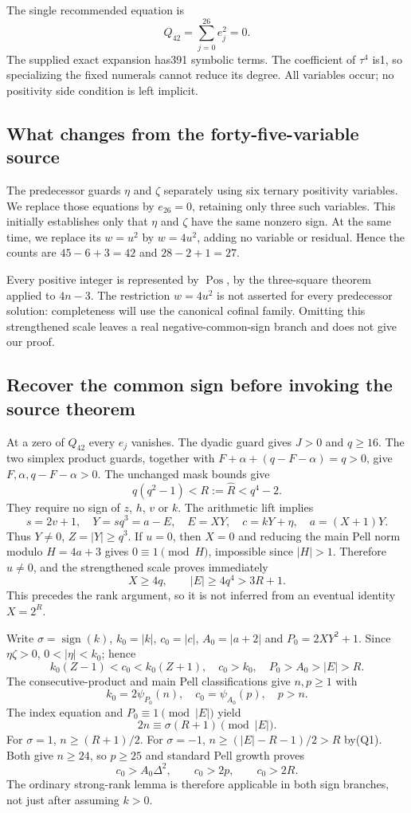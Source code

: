 The single recommended equation is
\[
 \boxed{\quad Q_{42}=\sum_{j=0}^{26}e_j^2=0.\quad}
\]
The supplied exact expansion has391 symbolic terms. The coefficient of
$\tau^4$ is1, so specializing the fixed numerals cannot reduce its degree.
All variables occur; no positivity side condition is left implicit.

\subsection{What changes from the forty-five-variable source}
The predecessor guards $\eta$ and $\zeta$ separately using six ternary
positivity variables. We replace those equations by $e_{26}=0$, retaining
only three such variables. This initially establishes only that $\eta$ and
$\zeta$ have the same nonzero sign. At the same time, we replace its
$w=u^2$ by $w=4u^2$, adding no variable or residual. Hence the counts are
$45-6+3=42$ and $28-2+1=27$.

Every positive integer is represented by $\operatorname{Pos}$, by the
three-square theorem applied to $4n-3$. The restriction $w=4u^2$ is not
asserted for every predecessor solution: completeness will use the
canonical cofinal family. Omitting this strengthened scale leaves a real
negative-common-sign branch and does not give our proof.

\subsection{Recover the common sign before invoking the source theorem}
At a zero of $Q_{42}$ every $e_j$ vanishes. The dyadic guard gives $J>0$ and
$q\ge16$. The two simplex product guards, together with
$F+\alpha+(q-F-\alpha)=q>0$, give $F,\alpha,q-F-\alpha>0$.
The unchanged mask bounds give
\[
 q(q^2-1)<R:=\widehat R<q^4-2.
\]
They require no sign of $z$, $h$, $v$ or $k$.
The arithmetic lift implies
\[
 s=2v+1,\quad Y=sq^3=a-E,\quad E=XY,\quad
 c=kY+\eta,\quad a=(X+1)Y.
\]
Thus $Y\ne0$, $Z=|Y|\ge q^3$. If $u=0$, then $X=0$ and reducing the
main Pell norm modulo $H=4a+3$ gives $0\equiv1\pmod H$, impossible since
$|H|>1$. Therefore $u\ne0$, and the strengthened scale proves immediately
\[
 X\ge4q,\qquad |E|\ge4q^4>3R+1.                 \tag{Q1}
\]
This precedes the rank argument, so it is not inferred from an eventual
identity $X=2^R$.

Write $\sigma=\operatorname{sign}(k)$, $k_0=|k|$, $c_0=|c|$,
$A_0=|a+2|$ and $P_0=2XY^2+1$. Since $\eta\zeta>0$,
$0<|\eta|<k_0$; hence
\[
 k_0(Z-1)<c_0<k_0(Z+1),\quad c_0>k_0,\quad
 P_0>A_0>|E|>R.
\]
The consecutive-product and main Pell classifications give $n,p\ge1$ with
\[
 k_0=2\psi_{P_0}(n),\quad c_0=\psi_{A_0}(p),\quad p>n.
\]
The index equation and $P_0\equiv1\pmod{|E|}$ yield
\[
 2n\equiv\sigma(R+1)\pmod{|E|}.
\]
For $\sigma=1$, $n\ge(R+1)/2$. For $\sigma=-1$,
$n\ge(|E|-R-1)/2>R$ by(Q1). Both give $n\ge24$, so $p\ge25$ and
standard Pell growth proves
\[
 c_0>A_0\Delta^2,\qquad c_0>2p,\qquad c_0>2R.     \tag{Q2}
\]
The ordinary strong-rank lemma is therefore applicable in both sign
branches, not just after assuming $k>0$.

